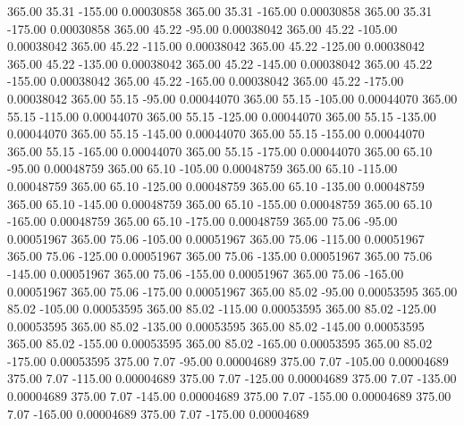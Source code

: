     365.00     35.31   -155.00     0.00030858
    365.00     35.31   -165.00     0.00030858
    365.00     35.31   -175.00     0.00030858
    365.00     45.22    -95.00     0.00038042
    365.00     45.22   -105.00     0.00038042
    365.00     45.22   -115.00     0.00038042
    365.00     45.22   -125.00     0.00038042
    365.00     45.22   -135.00     0.00038042
    365.00     45.22   -145.00     0.00038042
    365.00     45.22   -155.00     0.00038042
    365.00     45.22   -165.00     0.00038042
    365.00     45.22   -175.00     0.00038042
    365.00     55.15    -95.00     0.00044070
    365.00     55.15   -105.00     0.00044070
    365.00     55.15   -115.00     0.00044070
    365.00     55.15   -125.00     0.00044070
    365.00     55.15   -135.00     0.00044070
    365.00     55.15   -145.00     0.00044070
    365.00     55.15   -155.00     0.00044070
    365.00     55.15   -165.00     0.00044070
    365.00     55.15   -175.00     0.00044070
    365.00     65.10    -95.00     0.00048759
    365.00     65.10   -105.00     0.00048759
    365.00     65.10   -115.00     0.00048759
    365.00     65.10   -125.00     0.00048759
    365.00     65.10   -135.00     0.00048759
    365.00     65.10   -145.00     0.00048759
    365.00     65.10   -155.00     0.00048759
    365.00     65.10   -165.00     0.00048759
    365.00     65.10   -175.00     0.00048759
    365.00     75.06    -95.00     0.00051967
    365.00     75.06   -105.00     0.00051967
    365.00     75.06   -115.00     0.00051967
    365.00     75.06   -125.00     0.00051967
    365.00     75.06   -135.00     0.00051967
    365.00     75.06   -145.00     0.00051967
    365.00     75.06   -155.00     0.00051967
    365.00     75.06   -165.00     0.00051967
    365.00     75.06   -175.00     0.00051967
    365.00     85.02    -95.00     0.00053595
    365.00     85.02   -105.00     0.00053595
    365.00     85.02   -115.00     0.00053595
    365.00     85.02   -125.00     0.00053595
    365.00     85.02   -135.00     0.00053595
    365.00     85.02   -145.00     0.00053595
    365.00     85.02   -155.00     0.00053595
    365.00     85.02   -165.00     0.00053595
    365.00     85.02   -175.00     0.00053595
    375.00      7.07    -95.00     0.00004689
    375.00      7.07   -105.00     0.00004689
    375.00      7.07   -115.00     0.00004689
    375.00      7.07   -125.00     0.00004689
    375.00      7.07   -135.00     0.00004689
    375.00      7.07   -145.00     0.00004689
    375.00      7.07   -155.00     0.00004689
    375.00      7.07   -165.00     0.00004689
    375.00      7.07   -175.00     0.00004689
